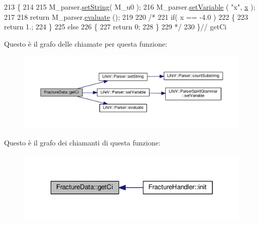 \begin{DoxyCode}
213 \{
214 
215     M\_parser.\hyperlink{classLifeV_1_1Parser_ac05769e836a0dc95d9c020df361a5194}{setString}( M\_u0 );
216     M\_parser.\hyperlink{classLifeV_1_1Parser_aa2b362e12b8feb60231705d499c9fbae}{setVariable} ( \textcolor{stringliteral}{"x"}, \hyperlink{confronto_8m_ad2e52d4a42a755ccd73c8de47175afa3}{x} );
217 
218     \textcolor{keywordflow}{return} M\_parser.\hyperlink{classLifeV_1_1Parser_a51d84fd4ae6d420620e7beee58fad673}{evaluate} ();
219 
220     \textcolor{comment}{/*}
221 \textcolor{comment}{    if( x == -4.0 )}
222 \textcolor{comment}{    \{}
223 \textcolor{comment}{        return 1.;}
224 \textcolor{comment}{    \}}
225 \textcolor{comment}{    else}
226 \textcolor{comment}{    \{}
227 \textcolor{comment}{        return 0;}
228 \textcolor{comment}{    \}}
229 \textcolor{comment}{    */}
230 \}\textcolor{comment}{// getCi}
\end{DoxyCode}


Questo è il grafo delle chiamate per questa funzione\-:
\nopagebreak
\begin{figure}[H]
\begin{center}
\leavevmode
\includegraphics[width=350pt]{classFractureData_a142a1bb428365b60ed002362ca566517_cgraph}
\end{center}
\end{figure}




Questo è il grafo dei chiamanti di questa funzione\-:
\nopagebreak
\begin{figure}[H]
\begin{center}
\leavevmode
\includegraphics[width=326pt]{classFractureData_a142a1bb428365b60ed002362ca566517_icgraph}
\end{center}
\end{figure}


